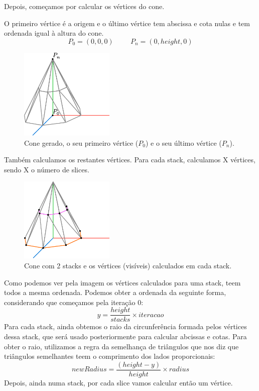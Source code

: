 \documentclass[12pt, a4paper]{article}
\begin{document}
Depois, começamos por calcular os vértices do cone.

O primeiro vértice é a origem e o último vértice tem abscissa e cota nulas e
tem ordenada igual à altura do cone.
$$
P_0 = (0, 0, 0)
\hspace{1cm}
P_n = (0, height, 0)
$$

\begin{figure}[H]
    \centering
    \includegraphics[width=0.4\textwidth]{res/figures/Cone1.pdf}
    \caption{
        Cone gerado, o seu primeiro vértice ($P_0$) e o seu último vértice ($P_n$).
    }
\end{figure}

Também calculamos os restantes vértices. Para cada stack, calculamos X
vértices, sendo X o número de slices.

\begin{figure}[H]
    \centering
    \includegraphics[width=0.4\textwidth]{res/figures/Cone2.pdf}
    \caption{
        Cone com 2 stacks e os vértices (visíveis) calculados em cada stack.
    }
\end{figure}

Como podemos ver pela imagem os vértices calculados para uma stack,
teem todos a mesma ordenada. Podemos obter a ordenada da seguinte forma,
considerando que começamos pela iteração 0:
$$
y = \frac{height}{stacks} \times iteracao
$$
Para cada stack, ainda obtemos o raio da circunferência formada pelos vértices dessa stack,
que será usado posteriormente para calcular abcissas e cotas.
Para obter o raio, utilizamos a regra da semelhança de triângulos que nos diz que triângulos
semelhantes teem o comprimento dos lados proporcionais:
$$
newRadius = \frac{(height - y)}{height}\times radius
$$
Depois, ainda numa stack, por cada slice vamos calcular então um vértice.
\end{document}
